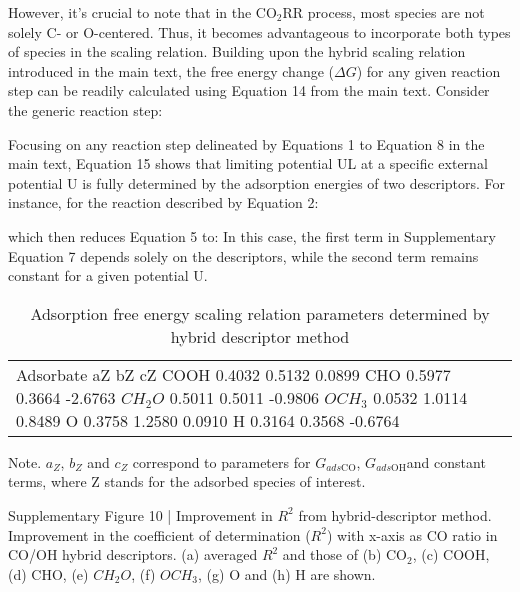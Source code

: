 However, it's crucial to note that in the CO$_2$RR process, most species are not solely C- or O-centered. Thus, it becomes advantageous to incorporate both types of species in the scaling relation. Building upon the hybrid scaling relation introduced in the main text, the free energy change ($\Delta\mathit{G}$) for any given reaction step can be readily calculated using Equation 14 from the main text. Consider the generic reaction step:

Focusing on any reaction step delineated by Equations 1 to Equation 8 in the main text, Equation 15 shows that limiting potential UL at a specific external potential U is fully determined by the adsorption energies of two descriptors. For instance, for the reaction described by Equation 2:


which then reduces Equation 5 to:
In this case, the first term in Supplementary Equation 7 depends solely on the descriptors, while the second term remains constant for a given potential U.


\begin{table}[h]
    \centering
    \begin{tabular}{lr}
      \hline
      Adsorbate	aZ	bZ	cZ
      \hline
      COOH	0.4032	0.5132	0.0899
      CHO	0.5977	0.3664	-2.6763
      $CH_2O$	0.5011	0.5011	-0.9806
      $OCH_3$	0.0532	1.0114	0.8489
      O	0.3758	1.2580	0.0910
      H	0.3164	0.3568	-0.6764
      \hline
    \end{tabular}
    \caption{Adsorption free energy scaling relation parameters determined by hybrid descriptor method
    }
    \label{si_table13}
\end{table}
Note. $a_{\mathit{Z}}$, $b_{\mathit{Z}}$ and $c_{\mathit{Z}}$ correspond to parameters for $G_{\mathit{ads}\mathrm{CO}}$, $G_{\mathit{ads}\mathrm{OH}}$and constant terms, where Z stands for the adsorbed species of interest.


Supplementary Figure 10 | Improvement in $R^2$ from hybrid-descriptor method. Improvement in the coefficient of determination ($R^2$) with x-axis as CO ratio in CO/OH hybrid descriptors. (a) averaged $R^2$ and those of (b) CO$_2$, (c) COOH, (d) CHO, (e) $CH_2O$, (f) $OCH_3$, (g) O and (h) H are shown.

